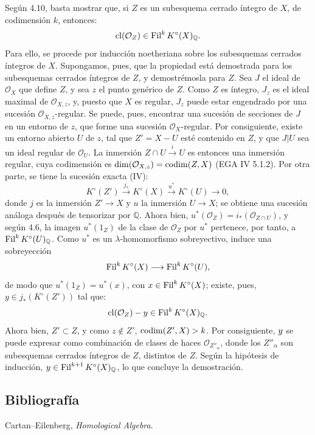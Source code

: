 Según 4.10, basta mostrar que, si \(Z\) es un subesquema cerrado íntegro de \(X\), de codimensión \(k\), entonces:
\[
  \operatorname{cl}(\mathcal O_Z)\in\Fil^kK^\circ(X)_{\mathbb Q}.
\]
Para ello, se procede por inducción noetheriana sobre los subesquemas cerrados íntegros de \(X\). Supongamos, pues, que la propiedad está demostrada para los subesquemas cerrados íntegros de \(Z\), y demostrémosla para \(Z\). Sea \(J\) el ideal de \(\mathcal O_X\) que define \(Z\), y sea \(z\) el punto genérico de \(Z\). Como \(Z\) es íntegro, \(J_z\) es el ideal maximal de \(\mathcal O_{X,z}\), y, puesto que \(X\) es regular, \(J_z\) puede estar engendrado por una sucesión \(\mathcal O_{X,z}\)-regular. Se puede, pues, encontrar una sucesión de secciones de \(J\) en un entorno de \(z\), que forme una sucesión \(\mathcal O_X\)-regular. Por consiguiente, existe un entorno abierto \(U\) de \(z\), tal que \(Z'=X-U\) esté contenido en \(Z\), y que \(J|U\) sea un ideal regular de \(\mathcal O_U\). La inmersión \(Z\cap U\xrightarrow{i}U\) es entonces una inmersión regular, cuya codimensión es \(\dim(\mathcal O_{X,z})=\codim(Z,X)\) (EGA IV 5.1.2). Por otra parte, se tiene la sucesión exacta (IV\qquad):
\[
  K^\circ(Z')\xrightarrow{j_*}K^\circ(X)
  \xrightarrow{u^*}K^\circ(U)\to0,
\]
donde \(j\) es la inmersión \(Z'\to X\) y \(u\) la inmersión \(U\to X\); se obtiene una sucesión análoga después de tensorizar por \(\mathbb Q\). Ahora bien, \(u^*(\mathcal O_Z)=i_*(\mathcal O_{Z\cap U})\), y según 4.6, la imagen \(u^*(1_Z)\) de la clase de \(\mathcal O_Z\) por \(u^*\) pertenece, por tanto, a \(\Fil^kK^\circ(U)_{\mathbb Q}\). Como \(u^*\) es un \(\lambda\)-homomorfismo sobreyectivo, induce una sobreyección
\[
  \Fil^kK^\circ(X)\longrightarrow \Fil^kK^\circ(U),
\]
de modo que \(u^*(1_Z)=u^*(x)\), con \(x\in\Fil^kK^\circ(X)\); existe, pues, \(y\in j_*(K^\circ(Z'))\) tal que:
\[
  \operatorname{cl}(\mathcal O_Z)-y\in\Fil^kK^\circ(X)_{\mathbb Q}.
\]
Ahora bien, \(Z'\subset Z\), y como \(z\notin Z'\), \(\codim(Z',X)>k\). Por consiguiente, \(\sisi{x}{y}\) se puede expresar como combinación de clases de haces \(\mathcal O_{Z''_\alpha}\), donde los \(Z''_\alpha\) son subesquemas cerrados íntegros de \(Z\), distintos de \(Z\). Según la hipótesis de inducción, \(\sisi{x}{y}\in\Fil^{k+1}K^\circ(X)_{\mathbb Q}\), lo que concluye la demostración.

\subsection*{Bibliografía}
\begin{enumerate}[label={[\arabic*]}]
\item Cartan--Eilenberg, \emph{Homological Algebra}.
\end{enumerate}



\providecommand{\etale}{\'etale}
\providecommand{\Ch}{\operatorname{Ch}}



